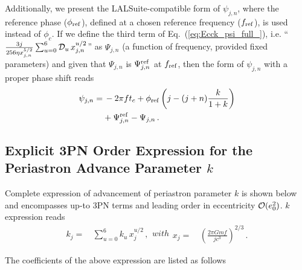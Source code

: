 \documentclass[aps,prd,twocolumn,superscriptaddress,groupedaddress,nofootinbib,showpacs,eqsecnum,useAms]{revtex4-2}
\begin{document}
Additionally, we present the LALSuite-compatible form of $\psi_{j,n}$, where the reference phase ($\phi_{\rm ref}$), defined at a chosen reference frequency ($f_{\rm ref}$), is used instead of $\phi_c$. If we define the third term of Eq.~(\ref{eq:Ecck_psi_full_}), i.e. ``$\frac{3 j}{256 \eta  x_{j,n}^{5/2}} \sum _{u=0}^6 {\cal D}_u\,x_{j,n}^{u/2}$'' as $\Psi_{j,n}$ (a function of frequency, provided fixed parameters) and given that $\Psi_{j,n}$ is $\Psi_{j,n}^{\rm ref}$ at $f_{\rm ref}$, then the form of $\psi_{j,n}$ with a proper phase shift reads
\begin{align}
\label{e:lal_psi_jn}
\psi_{j,n} =& \, -2 \pi  f t_c+\phi_{\rm ref} \left(j-(j+n)\frac{k}{1+k} \right) \notag \\
&+ \Psi_{j,n}^{\rm ref} - \Psi_{j,n}\,.
\end{align}

\subsection{Explicit 3PN Order Expression for the Periastron Advance Parameter $k$}\label{sec: periastron k}

Complete expression of advancement of periastron parameter $k$ is shown below and encompasses up-to 3PN terms and leading order in eccentricity ${\cal O}(e_0^2)$. $k$ expression reads
\begin{subequations}
\label{eq:k_full}
\begin{align}
k_j =& \, \sum_{u=0}^6 k_u \, x^{u/2}_j \,,
\end{align}
with
\begin{align}
x_j =& \, \left(\frac{2 \pi G m f}{j c^3}\right)^{2/3}\,. 
\end{align}
\end{subequations}

The coefficients of the above expression are listed as follows
\end{document}
